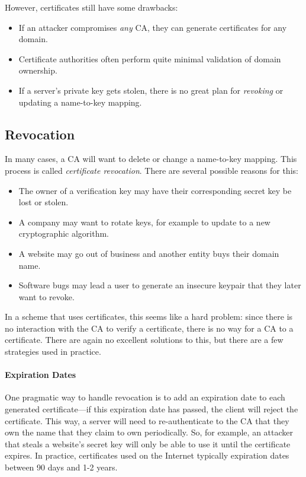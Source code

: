 However, certificates still have some drawbacks:
\begin{itemize}[noitemsep]
  \item If an attacker compromises \emph{any} CA, they can generate certificates for any domain.
	\item Certificate authorities often perform quite minimal validation of domain ownership.
	\item If a server's private key gets stolen, 
        there is no great plan for \emph{revoking} or updating a name-to-key mapping.
\end{itemize}

\subsection{Revocation}
In many cases, a CA will want to delete or change a name-to-key mapping.
This process is called \emph{certificate revocation}.
There are several possible reasons for this:
\begin{itemize}[noitemsep]
	\item The owner of a verification key may have their corresponding secret key
        be lost or stolen.
	\item A company may want to rotate keys, 
        for example to update to a new cryptographic algorithm.
	\item A website may go out of business and another entity buys their domain name.
	\item Software bugs may lead a user to generate an
        insecure keypair that they later want to revoke.\cite{yilek2009private,nemec2017return}
\end{itemize}

In a scheme that uses certificates, this seems like a hard problem: since there is no interaction with the CA to verify a certificate, there is no way for a CA to  a certificate. There are again no excellent solutions to this, but there are a few strategies used in practice.

\paragraph{Expiration Dates}
One pragmatic way to handle revocation is to add
an expiration date to each generated
certificate---if this expiration date has passed,
the client will reject the certificate. This way,
a server will need to re-authenticate to the CA
that they own the name that they claim to own
periodically. So, for example, an attacker that steals
a website's secret key will only be able to use it 
until the certificate expires.
In practice, certificates used on the Internet
typically expiration dates between 90 days 
and 1-2 years.

